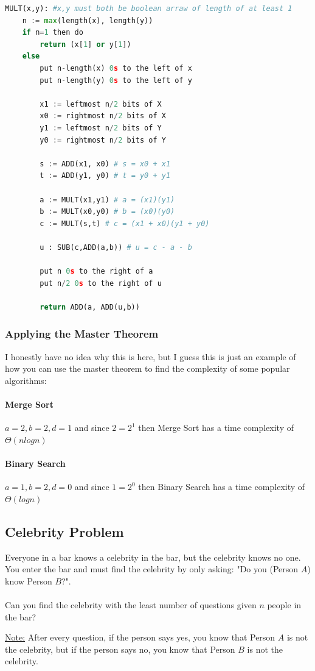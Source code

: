 \documentclass[12pt]{article}
\begin{document}
\begin{lstlisting}[language=Python]
MULT(x,y): #x,y must both be boolean arraw of length of at least 1
	n := max(length(x), length(y))
	if n=1 then do
		return (x[1] or y[1])
	else
		put n-length(x) 0s to the left of x
		put n-length(y) 0s to the left of y
		
		x1 := leftmost n/2 bits of X
		x0 := rightmost n/2 bits of X
		y1 := leftmost n/2 bits of Y
		y0 := rightmost n/2 bits of Y
		
		s := ADD(x1, x0) # s = x0 + x1
		t := ADD(y1, y0) # t = y0 + y1
		
		a := MULT(x1,y1) # a = (x1)(y1)
		b := MULT(x0,y0) # b = (x0)(y0)
		c := MULT(s,t) # c = (x1 + x0)(y1 + y0)
		
		u : SUB(c,ADD(a,b)) # u = c - a - b
		
		put n 0s to the right of a
		put n/2 0s to the right of u
		
		return ADD(a, ADD(u,b))
\end{lstlisting}

\subsubsection{Applying the Master Theorem}

I honestly have no idea why this is here, but I guess this is just an example of how you can use the master theorem to find the complexity of some popular algorithms:

\paragraph{Merge Sort} $a=2, b=2, d=1$ and since $2 = 2^1$ then Merge Sort has a time complexity of $\Theta (nlogn)$

\paragraph{Binary Search} $a=1, b=2,d=0$ and since $1 = 2^0$ then Binary Search has a time complexity of $\Theta (logn)$

\subsection{Celebrity Problem}

Everyone in a bar knows a celebrity in the bar, but the celebrity knows no one. You enter the bar and must find the celebrity by only asking: "Do you (Person $A$) know Person $B$?".\\
\\
Can you find the celebrity with the least number of questions given $n$ people in the bar?

\begin{tcolorbox}
	\underline{Note:} After every question, if the person says yes, you know that Person $A$ is not the celebrity, but if the person says no, you know that Person $B$ is not the celebrity.
\end{tcolorbox}
\end{document}
